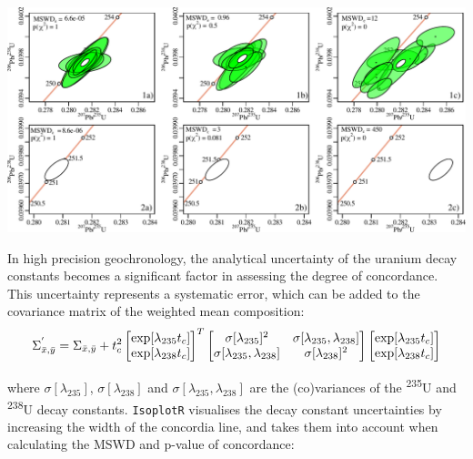 \begin{refsection}
\noindent\includegraphics[width=\textwidth]{../figures/concordia_MSWD.pdf}
\begingroup {}\endgroup

In high precision geochronology, the analytical uncertainty of the
uranium decay constants becomes a significant factor in assessing the
degree of concordance. This uncertainty represents a systematic error,
which can be added to the covariance matrix of the weighted mean
composition:
\begin{equation}
  \Sigma_{\bar{x},\bar{y}}^{'} =
  \Sigma_{\bar{x},\bar{y}} + t_c^2
  \left[
    \begin{array}{@{}c@{}}
      \exp[\lambda_{235}t_c] \\
      \exp[\lambda_{238}t_c]      
    \end{array}
    \right]^T
  \left[
    \begin{array}{@{}cc@{}}
      \sigma[\lambda_{235}]^2 & \sigma[\lambda_{235},\lambda_{238}] \\
      \sigma[\lambda_{235},\lambda_{238}] & \sigma[\lambda_{238}]^2
    \end{array}
    \right]
  \left[
    \begin{array}{@{}c@{}}
      \exp[\lambda_{235}t_c]\\
      \exp[\lambda_{238}t_c]
    \end{array}
    \right]
\end{equation}

\noindent where $\sigma[\lambda_{235}]$, $\sigma[\lambda_{238}]$ and
$\sigma[\lambda_{235},\lambda_{238}]$ are the (co)variances of the
\textsuperscript{235}U and \textsuperscript{238}U decay constants.
\texttt{IsoplotR} visualises the decay constant uncertainties by
increasing the width of the concordia line, and takes them into
account when calculating the MSWD and p-value of concordance:


\end{refsection}
